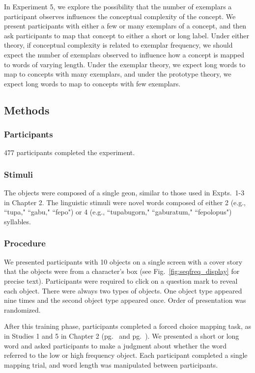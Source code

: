 In Experiment 5, we explore the possibility that the number of exemplars a participant observes influences the conceptual complexity of the concept. We present participants with either a few or many exemplars of a concept, and then ask participants to map that concept to either a short or long label. Under either theory, if conceptual complexity is related to exemplar frequency, we should expect the number of exemplars observed to influence how a concept is mapped to words of varying length. Under the exemplar theory, we expect long words to map to concepts with many exemplars, and under the prototype theory, we expect long words to map to concepts with few exemplars.

\subsection{Methods}
\subsubsection{Participants} 
477 participants completed the experiment.
\subsubsection{Stimuli} 
The objects were composed of a single geon, similar to those used in Expts.\ 1-3 in Chapter 2. The linguistic stimuli were novel words composed of either 2 (e.g., ``tupa," ``gabu," ``fepo")  or 4  (e.g., ``tupabugorn," ``gaburatum," ``fepolopus")  syllables.

\subsubsection{Procedure}
We presented participants with 10 objects on a single screen with a cover story that the objects were from a character's box (see Fig.\ \ref{fig:seqfreq_display} for precise text). Participants were required to click on a question mark to reveal each object. There were always two types of objects. One object type appeared nine times and the second object type appeared once. Order of presentation was randomized.

After this training phase, participants completed a forced choice mapping task, as in Studies 1 and 5 in Chapter 2 (pg.\ \pageref{ch2-1} and pg.\ \pageref{ch2-5}). We presented a short or long word and asked participants to make a judgment about whether the word referred to the low or high frequency object. Each participant completed a single mapping trial, and word length was manipulated between participants.

